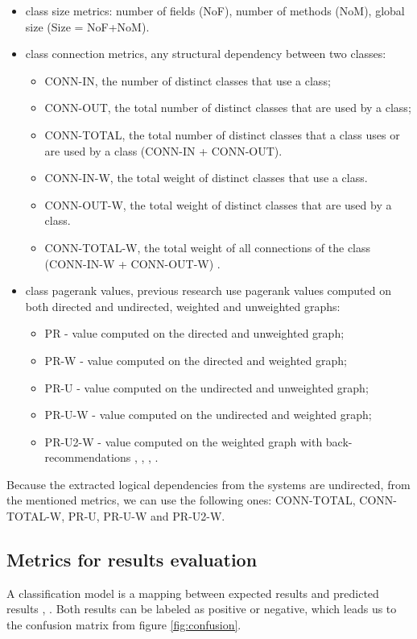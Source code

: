 \documentclass[12pt]{mitthesis}
\begin{document}
\begin{itemize}
	\item class size metrics: number of fields (NoF),  number of methods (NoM), global size (Size = NoF+NoM).
	\item class connection metrics, any structural dependency between two classes:
		\begin{itemize}
			\item CONN-IN, the number of distinct classes that use a class;
			\item CONN-OUT, the total number of distinct classes that are used by a class;
			\item CONN-TOTAL, the total number of distinct classes that a class uses or are used by a class (CONN-IN + CONN-OUT).
			\item CONN-IN-W, the total weight of distinct classes that use a class. 
			\item CONN-OUT-W, the total weight of distinct classes that are used by a class. 
			\item CONN-TOTAL-W, the total weight of all connections of the class (CONN-IN-W + CONN-OUT-W) \cite{Finding-key-classes}.
		\end{itemize}
	\item class pagerank values, previous research use pagerank values computed on both directed and undirected, weighted and unweighted graphs:
		\begin{itemize}
			\item PR - value computed on the directed and unweighted graph;
			\item PR-W - value computed on the directed and weighted graph;
			\item PR-U - value computed on the undirected and unweighted graph;
			\item PR-U-W - value computed on the undirected and weighted graph;
			\item PR-U2-W - value computed on the weighted graph with back-recommendations \cite{PagerankENASE}, \cite{enase15}, \cite{Finding-key-classes}, \cite{PagerankSACI}.
		\end{itemize}
\end{itemize}

Because the extracted logical dependencies from the systems are undirected, from the mentioned metrics, we can use the following ones:  CONN-TOTAL, CONN-TOTAL-W, PR-U, PR-U-W and PR-U2-W.

\subsection{Metrics for results evaluation}
\label{sec:evalmetrics}
A classification model is a mapping between expected results and predicted results \cite{ROCIntro}, \cite{ROCBRADLEY19971145}. Both results can be labeled as positive or negative, which leads us to the confusion matrix from figure \ref{fig:confusion}. 
\end{document}
